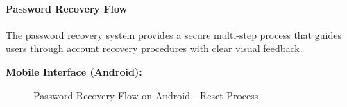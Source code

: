 \paragraph{Password Recovery Flow}
The password recovery system provides a secure multi-step process that guides users through account recovery procedures with clear visual feedback.

\textbf{Mobile Interface (Android):}
\begin{figure}[!htbp]
    \centering
    \hspace{0.05\textwidth}
    \caption{Password Recovery Flow on Android---Reset Process}
    \label{fig:android_password_recovery}
\end{figure}

